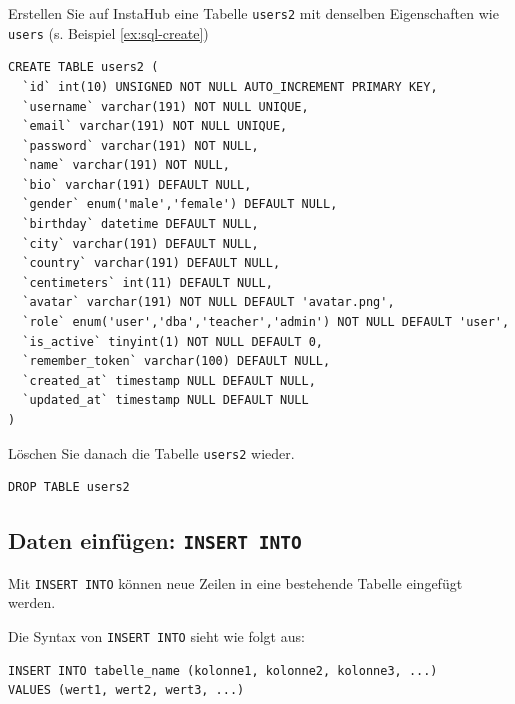 \begin{myexercise}
  Erstellen Sie auf InstaHub eine Tabelle \texttt{users2} mit denselben Eigenschaften wie \texttt{users} (s. Beispiel \ref{ex:sql-create})
  \begin{myanswer}
    \begin{lstlisting}
CREATE TABLE users2 (
  `id` int(10) UNSIGNED NOT NULL AUTO_INCREMENT PRIMARY KEY,
  `username` varchar(191) NOT NULL UNIQUE,
  `email` varchar(191) NOT NULL UNIQUE,
  `password` varchar(191) NOT NULL,
  `name` varchar(191) NOT NULL,
  `bio` varchar(191) DEFAULT NULL,
  `gender` enum('male','female') DEFAULT NULL,
  `birthday` datetime DEFAULT NULL,
  `city` varchar(191) DEFAULT NULL,
  `country` varchar(191) DEFAULT NULL,
  `centimeters` int(11) DEFAULT NULL,
  `avatar` varchar(191) NOT NULL DEFAULT 'avatar.png',
  `role` enum('user','dba','teacher','admin') NOT NULL DEFAULT 'user',
  `is_active` tinyint(1) NOT NULL DEFAULT 0,
  `remember_token` varchar(100) DEFAULT NULL,
  `created_at` timestamp NULL DEFAULT NULL,
  `updated_at` timestamp NULL DEFAULT NULL
)
\end{lstlisting}
  \end{myanswer}
\end{myexercise}

\begin{myexercise}
  Löschen Sie danach die Tabelle \texttt{users2} wieder.
  \begin{myanswer}
    \begin{lstlisting}
DROP TABLE users2
\end{lstlisting}
  \end{myanswer}
\end{myexercise}


\subsection{Daten einfügen: \texorpdfstring{\lstinline|INSERT INTO|}{INSERT INTO}}

Mit \lstinline|INSERT INTO| können neue Zeilen in eine bestehende Tabelle eingefügt werden.

Die Syntax von \lstinline|INSERT INTO| sieht wie folgt aus:

\begin{lstlisting}
INSERT INTO tabelle_name (kolonne1, kolonne2, kolonne3, ...)
VALUES (wert1, wert2, wert3, ...)
\end{lstlisting}

